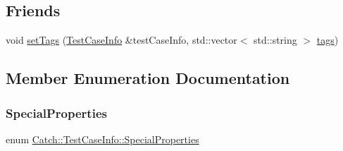 \subsection*{Friends}
\begin{DoxyCompactItemize}
\item 
void \mbox{\hyperlink{struct_catch_1_1_test_case_info_a0fe44abaf18ae7c26f98a9fc2b08679c}{set\+Tags}} (\mbox{\hyperlink{struct_catch_1_1_test_case_info}{Test\+Case\+Info}} \&test\+Case\+Info, std\+::vector$<$ std\+::string $>$ \mbox{\hyperlink{struct_catch_1_1_test_case_info_a150a7cbca1dd0c91799ccb14ff822eb0}{tags}})
\end{DoxyCompactItemize}


\subsection{Member Enumeration Documentation}
\mbox{\label{struct_catch_1_1_test_case_info_a39b232f74b4a7a6f2183b96759027eac}} 
\subsubsection{\texorpdfstring{Special\+Properties}{SpecialProperties}}
{\footnotesize\ttfamily enum \mbox{\hyperlink{struct_catch_1_1_test_case_info_a39b232f74b4a7a6f2183b96759027eac}{Catch\+::\+Test\+Case\+Info\+::\+Special\+Properties}}}

